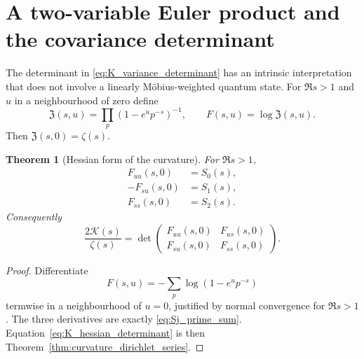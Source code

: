\documentclass[11pt]{amsart}
\numberwithin{equation}{section}
\theoremstyle{plain}
\newtheorem{theorem}{Theorem}[section]
\theoremstyle{definition}
\theoremstyle{remark}
\begin{document}
\section{A two-variable Euler product and the covariance determinant}
\label{sec:hessian_covariance}

The determinant in \eqref{eq:K_variance_determinant} has an intrinsic
interpretation that does not involve a linearly M\"obius-weighted quantum
state.  For \(\Re s>1\) and \(u\) in a neighbourhood of zero define
\begin{equation}
\mathfrak Z(s,u)=\prod_p\left(1-e^u p^{-s}\right)^{-1},
\qquad
F(s,u)=\log\mathfrak Z(s,u).
\label{eq:two_variable_euler_product}
\end{equation}
Then \(\mathfrak Z(s,0)=\zeta(s)\).

\begin{theorem}[Hessian form of the curvature]
\label{thm:hessian_curvature}
For \(\Re s>1\),
\begin{align}
F_{uu}(s,0)&=S_0(s),
\label{eq:Fuu_S0}\\
-F_{su}(s,0)&=S_1(s),
\label{eq:Fsu_S1}\\
F_{ss}(s,0)&=S_2(s).
\label{eq:Fss_S2}
\end{align}
Consequently
\begin{equation}
\boxed{
\frac{2\mathcal K(s)}{\zeta(s)}
=\det\!\begin{pmatrix}
F_{uu}(s,0)&F_{us}(s,0)\\
F_{su}(s,0)&F_{ss}(s,0)
\end{pmatrix}.}
\label{eq:K_hessian_determinant}
\end{equation}
\end{theorem}

\begin{proof}
Differentiate
\begin{equation}
F(s,u)=-\sum_p\log(1-e^u p^{-s})
\label{eq:F_log_euler}
\end{equation}
termwise in a neighbourhood of \(u=0\), justified by normal convergence for
\(\Re s>1\).  The three derivatives are exactly
\eqref{eq:Sj_prime_sum}.  Equation~\eqref{eq:K_hessian_determinant} is then
Theorem~\ref{thm:curvature_dirichlet_series}.
\end{proof}
\end{document}
